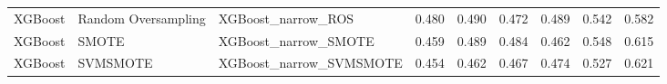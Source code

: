 \begin{tabular}{lllllllll}
                     XGBoost & Random Oversampling &                           XGBoost\_narrow\_ROS & 0.480 &                     0.490 &                 0.472 &                  0.489 &                                   0.542 &     0.582 \\
                     XGBoost &               SMOTE &                         XGBoost\_narrow\_SMOTE & 0.459 &                     0.489 &                 0.484 &                  0.462 &                                   0.548 &     0.615 \\
                     XGBoost &            SVMSMOTE &                      XGBoost\_narrow\_SVMSMOTE & 0.454 &                     0.462 &                 0.467 &                  0.474 &                                   0.527 &     0.621 \\
\bottomrule
\end{tabular}
